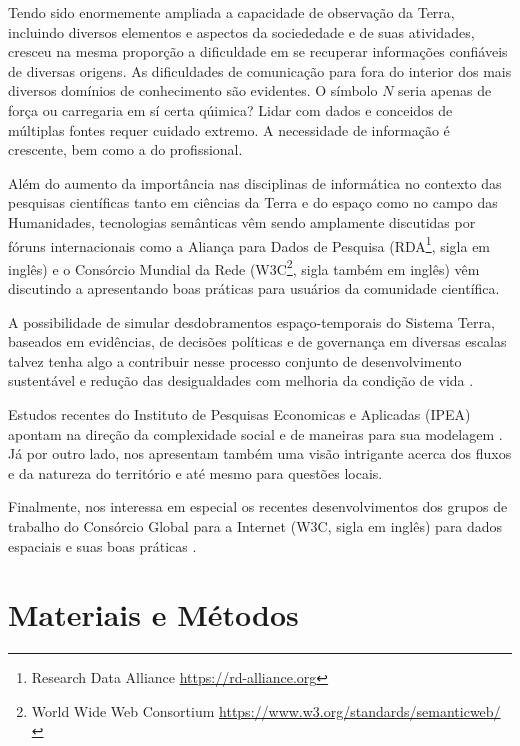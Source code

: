 \documentclass[
	12pt,				%
	openany,			%
	oneside,			%
	a4paper,			%
	english,			%
	french,				%
	spanish,			%
	brazil,				%
	]{abntex2}
\begin{document}
Tendo sido enormemente ampliada a capacidade de observação da Terra, incluindo diversos elementos e aspectos da sociededade e de suas atividades, cresceu na mesma proporção a dificuldade em se recuperar informações confiáveis de diversas origens. As dificuldades de comunicação para fora do interior dos mais diversos domínios de conhecimento são evidentes. O símbolo $N$ seria apenas de força ou carregaria em sí certa qúimica? Lidar com dados e conceidos de múltiplas fontes requer cuidado extremo. A necessidade de informação é crescente, bem como a do profissional.

Além do aumento da importância nas disciplinas de informática \cite{fox_rise_2012} no contexto das pesquisas científicas tanto em ciências da Terra e do espaço como no campo das Humanidades, tecnologias semânticas vêm sendo amplamente discutidas por fóruns internacionais como a Aliança para Dados de Pesquisa (RDA\footnote{Research Data Alliance \url{https://rd-alliance.org}}, sigla em inglês) e o Consórcio Mundial da Rede (W3C\footnote{World Wide Web Consortium \url{https://www.w3.org/standards/semanticweb/}}, sigla também em inglês) vêm discutindo a apresentando boas práticas para usuários da comunidade científica.

A possibilidade de simular desdobramentos espaço-temporais do Sistema Terra, baseados em evidências, de decisões políticas e de governança em diversas escalas talvez tenha algo a contribuir nesse processo conjunto de desenvolvimento sustentável e redução das desigualdades com melhoria da condição de vida \cite{patterson_exploring_2016}. 

Estudos recentes do Instituto de Pesquisas Economicas e Aplicadas (IPEA) apontam na direção da complexidade social \cite{furtado_complexity_2015} e de maneiras para sua modelagem \cite{da_silva_territory_2015}. Já por outro lado,  nos apresentam também uma visão intrigante acerca dos fluxos e da natureza do território e até mesmo para questões locais.

Finalmente, nos interessa em especial os recentes desenvolvimentos dos grupos de trabalho do Consórcio Global para a Internet (W3C, sigla em inglês) para dados espaciais \cite{w3c_spatial_2015} e suas boas práticas \cite{w3c_w3c_2015,taylor_where_2015}.


\chapter{Materiais e Métodos}
\end{document}
